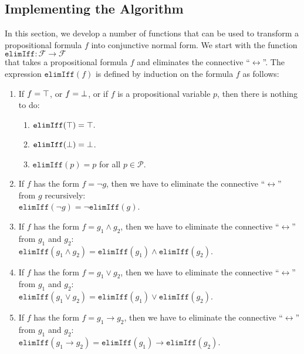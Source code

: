 \subsection{Implementing the Algorithm}
In this section, we develop a number of functions that can be used to transform a propositional
formula $f$ into conjunctive normal form.  We start with the function
\\[0.2cm]
\hspace*{1.3cm}
$\texttt{elimIff}: \mathcal{F} \rightarrow \mathcal{F}$
\\[0.2cm]
that takes a propositional formula  $f$ and eliminates the connective ``$\leftrightarrow$''.  The expression
$\texttt{elimIff}(f)$ is defined by induction on the formula $f$ as follows:
\begin{enumerate}
\item If $f = \top$, or $f = \bot$, or if $f$ is a propositional variable $p$, then there is
      nothing to do:
      \begin{enumerate}
      \item $\mathtt{elimIff}(\top) = \top.$
      \item $\mathtt{elimIff}(\bot) = \bot$.
      \item $\mathtt{elimIff}(p) = p$ \quad for all $p \in \mathcal{P}$.
      \end{enumerate}
\item If  $f$ has the form $f = \neg g$, then we have to eliminate the connective
      ``$\leftrightarrow$'' from $g$ recursively: \\[0.2cm]
      \hspace*{1.3cm} 
      $\mathtt{elimIff}(\neg g) = \neg \mathtt{elimIff}(g)$.
\item If $f$ has the form $f = g_1 \wedge g_2$, then we have to eliminate the connective
      ``$\leftrightarrow$'' from  $g_1$ and $g_2$: \\[0.2cm]
      \hspace*{1.3cm} 
      $\mathtt{elimIff}(g_1 \wedge g_2) = \mathtt{elimIff}(g_1) \wedge \mathtt{elimIff}(g_2)$.
\item If $f$ has the form $f = g_1 \vee g_2$, then we have to eliminate the connective
      ``$\leftrightarrow$'' from  $g_1$ and $g_2$: \\[0.2cm]
      \hspace*{1.3cm} 
      $\mathtt{elimIff}(g_1 \vee g_2) = \mathtt{elimIff}(g_1) \vee \mathtt{elimIff}(g_2)$.
\item If $f$ has the form $f = g_1 \rightarrow g_2$, then we have to eliminate the connective
      ``$\leftrightarrow$'' from $g_1$ and $g_2$: \\[0.2cm]
      \hspace*{1.3cm} 
      $\mathtt{elimIff}(g_1 \rightarrow g_2) = \mathtt{elimIff}(g_1) \rightarrow
      \mathtt{elimIff}(g_2)$.


\end{enumerate}
